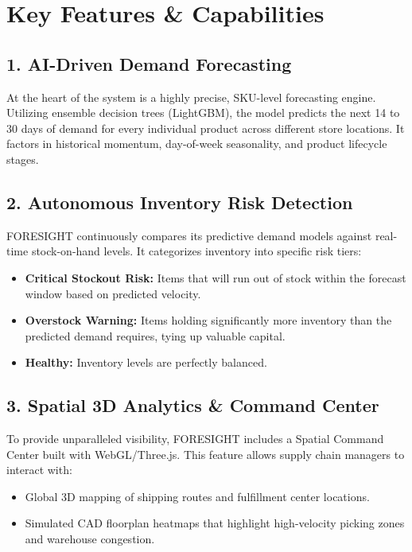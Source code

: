 \documentclass[12pt,a4paper]{report}
\begin{document}
\section{Key Features \& Capabilities}

\subsection{1. AI-Driven Demand Forecasting}
At the heart of the system is a highly precise, SKU-level forecasting engine. Utilizing ensemble decision trees (LightGBM), the model predicts the next 14 to 30 days of demand for every individual product across different store locations. It factors in historical momentum, day-of-week seasonality, and product lifecycle stages.

\subsection{2. Autonomous Inventory Risk Detection}
FORESIGHT continuously compares its predictive demand models against real-time stock-on-hand levels. It categorizes inventory into specific risk tiers:
\begin{itemize}
    \item \textbf{Critical Stockout Risk:} Items that will run out of stock within the forecast window based on predicted velocity.
    \item \textbf{Overstock Warning:} Items holding significantly more inventory than the predicted demand requires, tying up valuable capital.
    \item \textbf{Healthy:} Inventory levels are perfectly balanced.
\end{itemize}

\subsection{3. Spatial 3D Analytics \& Command Center}
To provide unparalleled visibility, FORESIGHT includes a Spatial Command Center built with WebGL/Three.js. This feature allows supply chain managers to interact with:
\begin{itemize}
    \item Global 3D mapping of shipping routes and fulfillment center locations.
    \item Simulated CAD floorplan heatmaps that highlight high-velocity picking zones and warehouse congestion.
\end{itemize}
\end{document}
